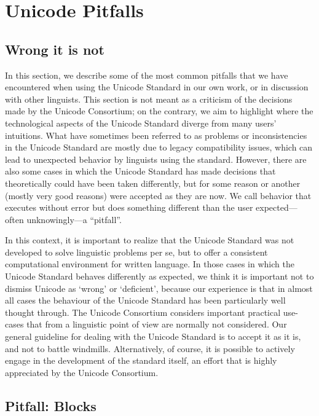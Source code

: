 \chapter{Unicode Pitfalls}
\label{unicode-pitfalls}

\section{Wrong it is not}
\label{wrong-it-is-not}

In this section, we describe some of the most common pitfalls that we have encountered when using the Unicode Standard in our own work, or in discussion with other linguists. This section is not meant as a criticism of the decisions made by the Unicode Consortium; on the contrary, we aim to highlight where the technological aspects of the Unicode Standard diverge from many users' intuitions. What have sometimes been referred to as problems or inconsistencies in the Unicode Standard are mostly due to legacy compatibility issues, which can lead to unexpected behavior by linguists using the standard. However, there are also some cases in which the Unicode Standard has made decisions that theoretically could have been taken differently, but for some reason or another (mostly very good reasons) were accepted as they are now. We call behavior that executes without error but does something different than the user expected---often unknowingly---a ``pitfall''.

In this context, it is important to realize that the Unicode Standard was not developed to solve linguistic problems per se, but to offer a consistent computational environment for written language. In those cases in which the Unicode Standard behaves differently as expected, we think it is important not to dismiss Unicode as `wrong' or `deficient', because our experience is that in almost all cases the behaviour of the Unicode Standard has been particularly well thought through. The Unicode Consortium considers important practical use-cases that from a linguistic point of view are normally not considered. Our general guideline for dealing with the Unicode Standard is to accept it as it is, and not to battle windmills. Alternatively, of course, it is possible to actively engage in the development of the standard itself, an effort that is highly appreciated by the Unicode Consortium.

\section{Pitfall: Blocks}
\label{pitfall-blocks}

